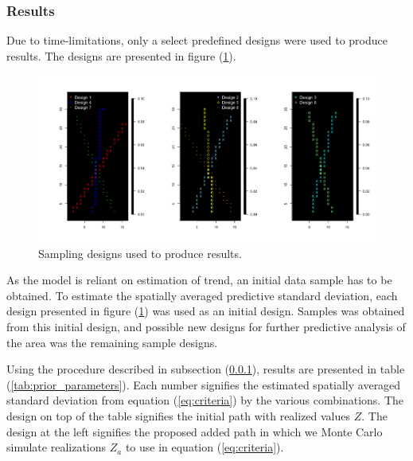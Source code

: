 \subsubsection{Results}	
Due to time-limitations, only a select predefined designs were used to produce results. The designs are presented in figure (\ref{fig:designs}). 

\begin{figure}[h]
	\hspace{-65pt}
	\includegraphics[width=1.3\linewidth]{figurer/design_lines.png}
    \caption{Sampling designs used to produce results.}
    \label{fig:designs}
\end{figure}

As the model is reliant on estimation of trend, an initial data sample has to be obtained. To estimate the spatially averaged predictive standard deviation, each design presented in figure (\ref{fig:designs}) was used as an initial design. Samples was obtained from this initial design, and possible new designs for further predictive analysis of the area was the remaining sample designs.

Using the procedure described in subsection (\ref{}), results are presented in table (\ref{tab:prior_parameters}). Each number signifies the estimated spatially averaged standard deviation from equation (\ref{eq:criteria}) by the various combinations. The design on top of the table signifies the initial path with realized values $Z$. The design at the left signifies the proposed added path in which we Monte Carlo simulate realizations $Z_a$ to use in equation (\ref{eq:criteria}). 

